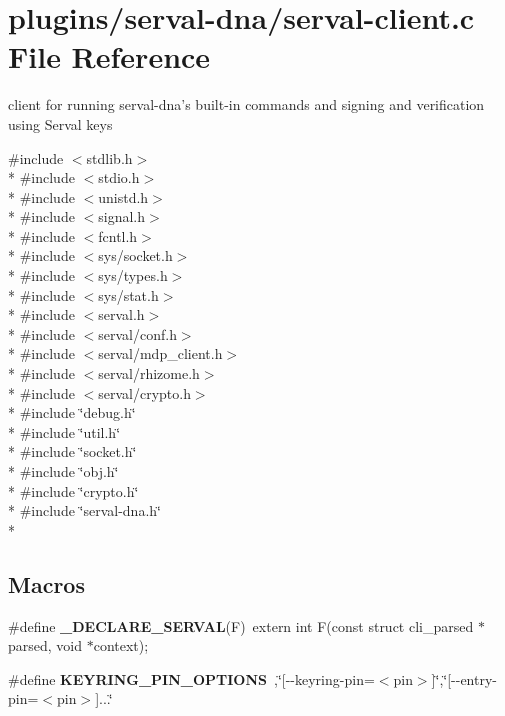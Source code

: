 \hypertarget{serval-client_8c}{\section{plugins/serval-\/dna/serval-\/client.c File Reference}
\label{serval-client_8c}
}


client for running serval-\/dna's built-\/in commands and signing and verification using Serval keys  


{\ttfamily \#include $<$stdlib.\+h$>$}\\*
{\ttfamily \#include $<$stdio.\+h$>$}\\*
{\ttfamily \#include $<$unistd.\+h$>$}\\*
{\ttfamily \#include $<$signal.\+h$>$}\\*
{\ttfamily \#include $<$fcntl.\+h$>$}\\*
{\ttfamily \#include $<$sys/socket.\+h$>$}\\*
{\ttfamily \#include $<$sys/types.\+h$>$}\\*
{\ttfamily \#include $<$sys/stat.\+h$>$}\\*
{\ttfamily \#include $<$serval.\+h$>$}\\*
{\ttfamily \#include $<$serval/conf.\+h$>$}\\*
{\ttfamily \#include $<$serval/mdp\+\_\+client.\+h$>$}\\*
{\ttfamily \#include $<$serval/rhizome.\+h$>$}\\*
{\ttfamily \#include $<$serval/crypto.\+h$>$}\\*
{\ttfamily \#include \char`\"{}debug.\+h\char`\"{}}\\*
{\ttfamily \#include \char`\"{}util.\+h\char`\"{}}\\*
{\ttfamily \#include \char`\"{}socket.\+h\char`\"{}}\\*
{\ttfamily \#include \char`\"{}obj.\+h\char`\"{}}\\*
{\ttfamily \#include \char`\"{}crypto.\+h\char`\"{}}\\*
{\ttfamily \#include \char`\"{}serval-\/dna.\+h\char`\"{}}\\*
\subsection*{Macros}
\begin{DoxyCompactItemize}
\item 
\hypertarget{serval-client_8c_ab0fc78ef17e183991c792dd29b73586b}{\#define {\bfseries \+\_\+\+D\+E\+C\+L\+A\+R\+E\+\_\+\+S\+E\+R\+V\+A\+L}(F)~extern int F(const struct cli\+\_\+parsed $\ast$parsed, void $\ast$context);}\label{serval-client_8c_ab0fc78ef17e183991c792dd29b73586b}

\item 
\hypertarget{serval-client_8c_a6673788ba40e8532353e55a1adb39166}{\#define {\bfseries K\+E\+Y\+R\+I\+N\+G\+\_\+\+P\+I\+N\+\_\+\+O\+P\+T\+I\+O\+N\+S}~,\char`\"{}\mbox{[}-\/-\/keyring-\/pin=$<$pin$>$\mbox{]}\char`\"{},\char`\"{}\mbox{[}-\/-\/entry-\/pin=$<$pin$>$\mbox{]}...\char`\"{}}\label{serval-client_8c_a6673788ba40e8532353e55a1adb39166}

\end{DoxyCompactItemize}

